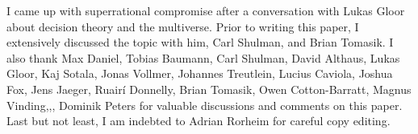 I came up with superrational compromise after a conversation with Lukas
Gloor about decision theory and the multiverse. Prior to writing this
paper, I extensively discussed the topic with him, Carl Shulman, and
Brian Tomasik. I also thank Max Daniel, Tobias Baumann, Carl Shulman,
David Althaus, Lukas Gloor, Kaj Sotala, Jonas Vollmer, Johannes
Treutlein, Lucius Caviola, Joshua Fox, Jens Jaeger, Ruairí Donnelly,
Brian Tomasik, Owen Cotton-Barratt, Magnus Vinding,,, Dominik Peters for
valuable discussions and comments on this paper. Last but not least, I
am indebted to Adrian Rorheim for careful copy editing.

